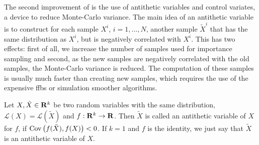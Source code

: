 The second improvement of \citep{Durbin1997Monte} is the use of antithetic variables and control variates, a device to reduce Monte-Carlo variance. The main idea of an antithetic variable is to construct for each sample $X^{i}$, $i = 1,\dots, N$, another sample $\tilde X^{i}$ that has the same distribution as $X^{i}$, but is negatively correlated with $X^{i}$. This has two effects: first of all, we increase the number of samples used for importance sampling and second, as the new samples are negatively correlated with the old samples, the Monte-Carlo variance is reduced. The computation of these samples is usually much faster than creating new samples, which requires the use of the expensive \acrshort{ffbs} or simulation smoother algorithms. 
\begin{definition}
    Let $X, \tilde X\in\mathbf R^{k}$ be two random variables with the same distribution, $\mathcal L (X) = \mathcal L(\tilde X)$ and $f: \mathbf R^{k} \to \mathbf R$. Then $\tilde X$ is called an antithetic variable of $X$ for $f$, if $\operatorname{Cov} \left( f(\tilde X), f(X) \right) < 0$. If $k = 1$ and $f$ is the identity, we just say that $\tilde X$ is an antithetic variable of $X$.
\end{definition}

